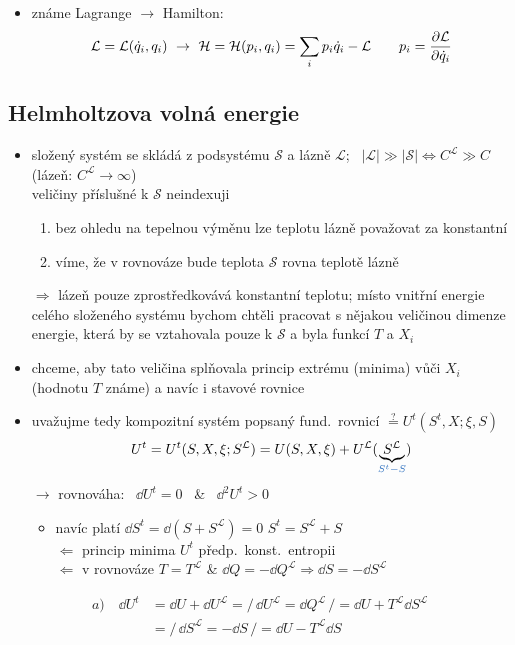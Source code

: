 \begin{itemize}
  \item známe Lagrange $\to$ Hamilton:
  \[
    \mathcal{L} = \mathcal{L}(\dot q_i, q_i) \ \to\ \mathcal{H} = \mathcal{H}(p_i,q_i) = \sum_i p_i\dot q_i - \mathcal{L}
    \qquad p_i = \pdv{\mathcal{L}}{\dot q_i}
  \]
\end{itemize}

\subsection{Helmholtzova volná energie}
\begin{itemize}
  \item složený systém se skládá z podsystému $\mathcal{S}$ a lázně $\mathcal{L}$; \ $|\mathcal{L}|\gg|\mathcal{S}| \Leftrightarrow C^{\mathcal{L}}\gg C$
  \quad \textcolor{NavyBlue}{\small (lázeň: $C^{\mathcal{L}}\to\infty$)} \\
  \textcolor{NavyBlue}{\small \hfill veličiny příslušné k $\mathcal{S}$ neindexuji}
  \begin{enumerate}[label=\roman*)]
    \item bez ohledu na tepelnou výměnu lze teplotu lázně považovat za konstantní
    \item víme, že v rovnováze bude teplota $\mathcal{S}$ rovna teplotě lázně
  \end{enumerate}
  $\Rightarrow$ lázeň pouze zprostředkovává konstantní teplotu; místo vnitřní energie celého složeného systému bychom chtěli pracovat s nějakou veličinou dimenze energie, která by se vztahovala pouze k $\mathcal{S}$ a byla funkcí $T$ a $X_i$
  \item chceme, aby tato veličina splňovala princip extrému (minima) vůči $X_i$ (hodnotu $T$ známe) a navíc  i stavové rovnice
  \item uvažujme tedy kompozitní systém popsaný fund.\ rovnicí \textcolor{NavyBlue}{\small $\overset{?}{=}U^t(S^t,X;\xi,S)$}
  \[
    U^t = U^t(S,X,\xi;S^{\mathcal{L}}) = U(S,X,\xi) + U^{\mathcal{L}}(\underbrace{S^{\mathcal{L}}}_{\textcolor{NavyBlue}{S^t - S}})
  \]
  $\to$ rovnováha: \ $\dd U^t = 0$ \ \& \ $\dd^2U^t > 0$
  \begin{itemize}[nosep]
    \item navíc platí $\dd S^t = \dd(S + S^{\mathcal{L}}) = 0$ \hfill \textcolor{NavyBlue}{\small $S^t = S^{\mathcal{L}} + S$} \\
    $\Leftarrow$ princip minima $U^t$ předp.\ konst.\ entropii \\
    $\Leftarrow$ v rovnováze $T = T^{\mathcal{L}}$ \& $\dd Q = -\dd Q^{\mathcal{L}} \Rightarrow \dd S = -\dd S^{\mathcal{L}}$
  \end{itemize}
\end{itemize}
\begin{align*}
  a)\quad \dd U^t &= \dd U + \dd U^{\mathcal{L}} = \big/\,\dd U^{\mathcal{L}} = \dd Q^{\mathcal{L}}\,\big/ = \dd U + T^{\mathcal{L}}\dd S^{\mathcal{L}} \\
  &= \big/\,\dd S^{\mathcal{L}} = -\dd S\,\big/ = \dd U - T^{\mathcal{L}}\dd S
\end{align*}

